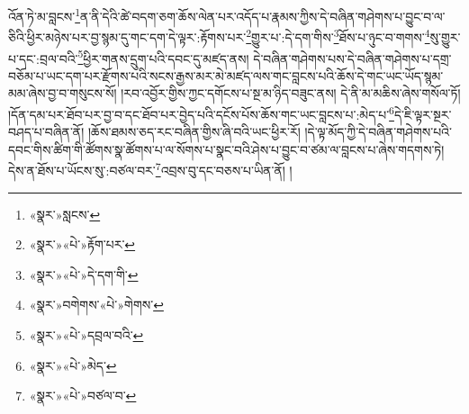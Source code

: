 འོན་ཏེ་མ་བླངས་\footnote{«སྣར་»སླངས་}ན་ནི་དེའི་ཚེ་བདག་ཅག་ཆོས་ལེན་པར་འདོད་པ་རྣམས་ཀྱིས་དེ་བཞིན་གཤེགས་པ་བྱུང་བ་ལ་ཅིའི་ཕྱིར་མཉེས་པར་བྱ་སྙམ་དུ་གང་དག་དེ་ལྟར་:རྟོགས་པར་\footnote{«སྣར་»«པེ་»རྟོག་པར་}གྱུར་པ་:དེ་དག་གིས་\footnote{«སྣར་»«པེ་»དེ་དག་གི་}ཐོས་པ་ཉུང་བ་གགས་\footnote{«སྣར་»བགེགས་«པེ་»གེགས་}སུ་གྱུར་པ་དང་:བྲལ་བའི་\footnote{«སྣར་»«པེ་»དབྲལ་བའི་}ཕྱིར་གནས་དྲུག་པའི་དབང་དུ་མཛད་ནས། དེ་བཞིན་གཤེགས་པས་དེ་བཞིན་གཤེགས་པ་དགྲ་བཅོམ་པ་ཡང་དག་པར་རྫོགས་པའི་སངས་རྒྱས་མར་མེ་མཛད་ལས་གང་བླངས་པའི་ཆོས་དེ་གང་ཡང་ཡོད་སྙམ་མམ་ཞེས་བྱ་བ་གསུངས་སོ། །རབ་འབྱོར་གྱིས་ཀྱང་དགོངས་པ་སྔ་མ་ཉིད་བཟུང་ནས། དེ་ནི་མ་མཆིས་ཞེས་གསོལ་ཏོ། །དོན་དམ་པར་ཐོབ་པར་བྱ་བ་དང་ཐོབ་པར་བྱེད་པའི་དངོས་པོས་ཆོས་གང་ཡང་བླངས་པ་:མེད་པ་\footnote{«སྣར་»«པེ་»མེད་}དེ་ཇི་ལྟར་སྔར་བཤད་པ་བཞིན་ནོ། །ཆོས་ཐམས་ཅད་རང་བཞིན་གྱིས་ཞི་བའི་ཡང་ཕྱིར་རོ། །དེ་ལྟ་མོད་ཀྱི་དེ་བཞིན་གཤེགས་པའི་དབང་གིས་ཚིག་གི་ཚོགས་སྣ་ཚོགས་པ་ལ་སོགས་པ་སྣང་བའི་ཤེས་པ་བྱུང་བ་ཙམ་ལ་བླངས་པ་ཞེས་གདགས་ཏེ། དེས་ན་ཐོས་པ་ཡོངས་སུ་:བཙལ་བར་\footnote{«སྣར་»«པེ་»བཙལ་བ་}འབྲས་བུ་དང་བཅས་པ་ཡིན་ནོ། །

